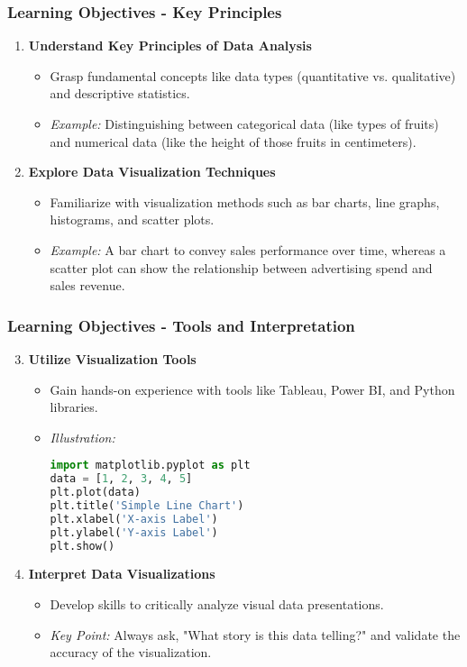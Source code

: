 \documentclass{beamer}
\begin{document}
\begin{frame}[fragile]
    \frametitle{Learning Objectives - Key Principles}
    \begin{enumerate}
        \item \textbf{Understand Key Principles of Data Analysis}
        \begin{itemize}
            \item Grasp fundamental concepts like data types (quantitative vs. qualitative) and descriptive statistics.
            \item \textit{Example:} Distinguishing between categorical data (like types of fruits) and numerical data (like the height of those fruits in centimeters).
        \end{itemize}

        \item \textbf{Explore Data Visualization Techniques}
        \begin{itemize}
            \item Familiarize with visualization methods such as bar charts, line graphs, histograms, and scatter plots.
            \item \textit{Example:} A bar chart to convey sales performance over time, whereas a scatter plot can show the relationship between advertising spend and sales revenue.
        \end{itemize}
    \end{enumerate}
\end{frame}

\begin{frame}[fragile]
    \frametitle{Learning Objectives - Tools and Interpretation}
    \begin{enumerate}
        \setcounter{enumi}{2}
        \item \textbf{Utilize Visualization Tools}
        \begin{itemize}
            \item Gain hands-on experience with tools like Tableau, Power BI, and Python libraries.
            \item \textit{Illustration:}
            \begin{lstlisting}[language=Python]
import matplotlib.pyplot as plt
data = [1, 2, 3, 4, 5]
plt.plot(data)
plt.title('Simple Line Chart')
plt.xlabel('X-axis Label')
plt.ylabel('Y-axis Label')
plt.show()
            \end{lstlisting}
        \end{itemize}

        \item \textbf{Interpret Data Visualizations}
        \begin{itemize}
            \item Develop skills to critically analyze visual data presentations.
            \item \textit{Key Point:} Always ask, "What story is this data telling?" and validate the accuracy of the visualization.
        \end{itemize}
    \end{enumerate}
\end{frame}
\end{document}
